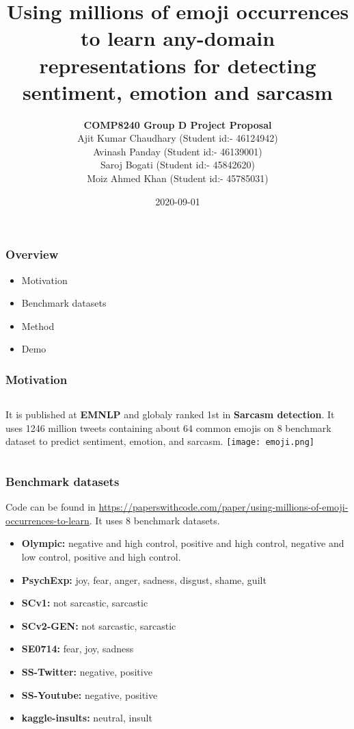 \documentclass{beamer}
\title{Using millions of emoji occurrences to learn any-domain representations for detecting sentiment, emotion and sarcasm}
\author{
\textbf{COMP8240 Group D Project Proposal} \\
\vspace{5mm} %
Ajit Kumar Chaudhary (Student id:- 46124942) \\
Avinash Panday (Student id:- 46139001) \\
Saroj Bogati (Student id:- 45842620) \\
Moiz Ahmed Khan (Student id:- 45785031) \\
}
\institute{Macquaire University}
\date{2020-09-01}
\begin{document}
\frame{\titlepage}

\begin{frame}

\frametitle{Overview}

\begin{itemize}
\item Motivation 
\item Benchmark datasets 
\item Method
\item Demo
\end{itemize}

\end{frame}


\begin{frame}
\frametitle{Motivation}
\begin{columns}
It is published at  \textbf{EMNLP} and globaly ranked 1st in \textbf{Sarcasm detection}. It uses 1246 million tweets containing about 64 common emojis on 8 benchmark dataset to predict sentiment, emotion, and sarcasm. 
\texttt{[image: emoji.png]}
\end{columns}
\end{frame}

\begin{frame}

\frametitle{Benchmark datasets}
Code can be found in \url{https://paperswithcode.com/paper/using-millions-of-emoji-occurrences-to-learn}. It uses 8 benchmark datasets.
\begin{itemize}
\item \textbf{Olympic:} negative and high control, positive and high control, negative and low control, positive and high control.
\item \textbf{PsychExp:} joy, fear, anger, sadness, disgust, shame, guilt
\item \textbf{SCv1:} not sarcastic, sarcastic
\item \textbf{SCv2-GEN:} not sarcastic, sarcastic
\item \textbf{SE0714:} fear, joy, sadness
\item \textbf{SS-Twitter:} negative, positive
\item \textbf{SS-Youtube:} negative, positive
\item \textbf{kaggle-insults:} neutral, insult
\end{itemize}
\end{frame}
\end{document}
